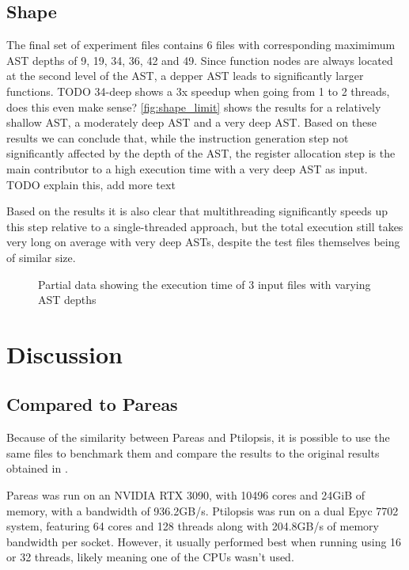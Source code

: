 \documentclass[12pt,dvipsnames]{article}
\newcommand{\helpme}[1]{{\color{red}#1}}
\begin{document}
\subsection{Shape} \label{shape}
The final set of experiment files contains 6 files with corresponding maximimum AST depths of 9, 19, 34, 36, 42 and 49. Since function nodes are always located at the second level of the AST, a depper AST leads to significantly larger functions.
\helpme{TODO 34-deep shows a 3x speedup when going from 1 to 2 threads, does this even make sense?}
\autoref{fig:shape_limit} shows the results for a relatively shallow AST, a moderately deep AST and a very deep AST. Based on these results we can conclude that, while the instruction generation step not significantly affected by the depth of the AST, the register allocation step is the main contributor to a high execution time with a very deep AST as input.
\helpme{TODO explain this, add more text}

Based on the results it is also clear that multithreading significantly speeds up this step relative to a single-threaded approach, but the total execution still takes very long on average with very deep ASTs, despite the test files themselves being of similar size.

\begin{figure}[!ht]
    \centering
    \caption{Partial data showing the execution time of 3 input files with varying AST depths}
    \label{fig:shape_limit}
\end{figure}

\newpage

\section{Discussion} \label{discussion}
\subsection{Compared to Pareas}

Because of the similarity between Pareas and Ptilopsis, it is possible to use the same files to benchmark them and compare the results to the original results obtained in \cite{huijben2021}.

Pareas was run on an NVIDIA RTX 3090, with 10496 cores and 24GiB of memory, with a bandwidth of 936.2GB/s. Ptilopsis was run on a dual Epyc 7702 system, featuring 64 cores and 128 threads along with 204.8GB/s of memory bandwidth per socket. However, it usually performed best when running using 16 or 32 threads, likely meaning one of the CPUs wasn't used.
\end{document}
